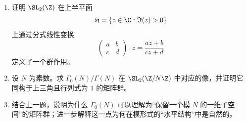 \begin{enumerate}[start=56, label=\textbf{习题6.\arabic*.}, leftmargin=7em]
  \[
    \SL_2(\Z)/\Gamma(N) \cong \SL_2(\Z/N\Z).
  \]
  \item \hard 证明 $\SL_2(\Z)$ 在上半平面
  \[
    \mathfrak{H}=\{z\in \C: \Im(z)>0\}
  \]
  上通过分式线性变换
  \[
    \begin{pmatrix}a&b\\ c&d\end{pmatrix}·z=\frac{az+b}{cz+d}
  \]
  定义了一个群作用。
  \item \hard 设 $N$ 为素数。求 $\Gamma_0(N)/\Gamma(N)$ 在 $\SL_2(\Z/N\Z)$ 中对应的像，并证明它同构于上三角且行列式为 $1$ 的矩阵群。
  \item \hard 结合上一题，说明为什么 $\Gamma_0(N)$ 可以理解为“保留一个模 $N$ 的一维子空间”的矩阵群；进一步解释这一点为何在模形式的“水平结构”中是自然的。
\end{enumerate}

